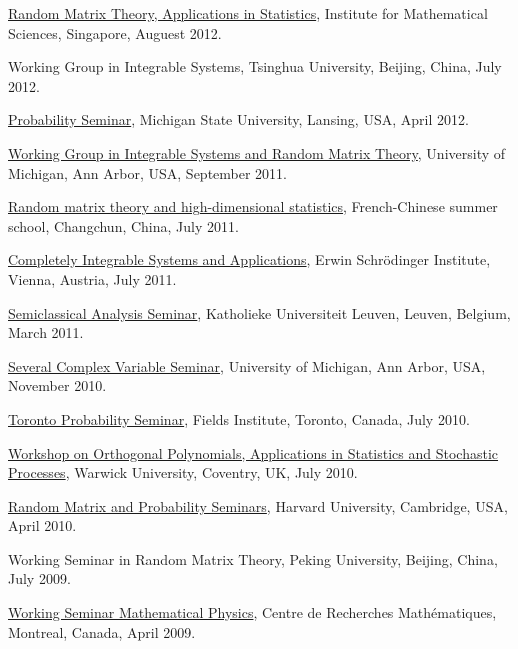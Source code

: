 \documentclass[12pt,a4paper]{article}
\newenvironment{item_list}{
 \begin{list}{}{
   \setlength{\leftmargin}{1.5em}
   \setlength{\itemsep}{0.25em}
   \setlength{\parskip}{0pt}
   \setlength{\parsep}{0.25em}
 }
}{
 \end{list}
}
\begin{document}
\begin{item_list}
  \href{http://www2.ims.nus.edu.sg/Programs/012random/wk2.php}{Random Matrix Theory, Applications in Statistics}, Institute for Mathematical Sciences, Singapore, Auguest 2012.
\item
  Working Group in Integrable Systems, Tsinghua University, Beijing, China, July 2012.
\item
  \href{http://mathdata.msu.edu/Seminar/Recent.asp?s=928}{Probability Seminar}, Michigan State University, Lansing, USA, April 2012.
\item
  \href{http://www.math.lsa.umich.edu/seminars_events/events.php?eventdefid=43&dt_begin=2011-07-01&dt_end=2011-12-31}{Working Group in Integrable Systems and Random Matrix Theory}, University of Michigan, Ann Arbor, USA, September 2011.
\item
  \href{http://web.hku.hk/~jeffyao/ss/}{Random matrix theory and high-dimensional statistics},  French-Chinese summer school, Changchun, China, July 2011.
\item
  \href{http://www.esf.org/activities/esf-conferences/details/2011/confdetail369.html}{Completely Integrable Systems and Applications}, Erwin Schr\"{o}dinger Institute, Vienna, Austria, July 2011.
\item
  \href{http://wis.kuleuven.be/analyse/seminar-classical.html}{Semiclassical Analysis Seminar}, Katholieke Universiteit Leuven, Leuven, Belgium, March 2011.
\item
  \href{http://www.math.lsa.umich.edu/seminars/scv/}{Several Complex Variable Seminar}, University of Michigan, Ann Arbor, USA, November 2010.
\item
  \href{http://www.math.utoronto.ca/cms/toronto-probability-seminar/}{Toronto Probability Seminar}, Fields Institute, Toronto, Canada, July 2010.
\item
  \href{http://www2.warwick.ac.uk/fac/sci/statistics/crism/workshops/orthogonal-polynomials/}{Workshop on Orthogonal Polynomials, Applications in Statistics and Stochastic Processes}, Warwick University, Coventry, UK, July 2010.
\item
  \href{http://www.math.harvard.edu/cgi-bin/showtalk.pl}{Random Matrix and Probability Seminars}, Harvard University, Cambridge, USA, April 2010.
\item
  Working Seminar in Random Matrix Theory, Peking University, Beijing, China, July 2009.
\item
  \href{http://www.crm.umontreal.ca/cal/en/mois200804.html}{Working Seminar Mathematical Physics}, Centre de Recherches Math\'{e}matiques, Montreal, Canada, April 2009.

\end{item_list}
\end{document}
